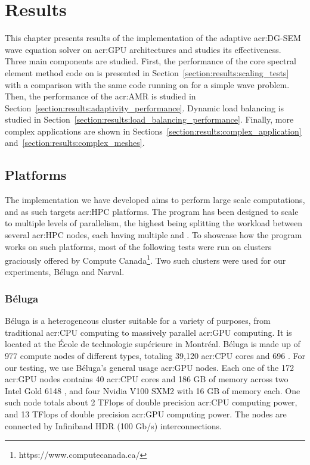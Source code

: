 \chapter{Results}\label{chapter:results}

This chapter presents results of the implementation of the adaptive \acrshort{acr:DG-SEM} wave
equation solver on \acrshort{acr:GPU} architectures and studies its effectiveness. Three main
components are studied. First, the performance of the core spectral element method code on
 is presented in Section~\ref{section:results:scaling_tests} with a comparison
with the same code running on  for a simple wave problem. Then, the performance
of the \acrlong{acr:AMR} is studied in Section~\ref{section:results:adaptivity_performance}. Dynamic
load balancing is studied in Section~\ref{section:results:load_balancing_performance}. Finally, more
complex applications are shown in Sections~\ref{section:results:complex_application}
and~\ref{section:results:complex_meshes}.

\section{Platforms}\label{section:results:platforms}

The implementation we have developed aims to perform large scale computations, and as such targets
\acrshort{acr:HPC} platforms. The program has been designed to scale to multiple levels of
parallelism, the highest being splitting the workload between several \acrshort{acr:HPC} nodes, each
having multiple  and . To showcase how the program works on
such platforms, most of the following tests were run on clusters graciously offered by Compute
Canada\footnote{https://www.computecanada.ca/}. Two such clusters were used for our experiments,
Béluga and Narval.

\subsection{Béluga}\label{subsection:results:platforms:beluga}

Béluga is a heterogeneous cluster suitable for a variety of purposes, from traditional
\acrshort{acr:CPU} computing to massively parallel \acrshort{acr:GPU} computing. It is located at
the École de technologie supérieure in Montréal. Béluga is made up of 977 compute nodes of different
types, totaling 39,120 \acrshort{acr:CPU} cores and 696 . For our testing, we
use Béluga's general usage \acrshort{acr:GPU} nodes. Each one of the 172 \acrshort{acr:GPU} nodes
contains 40 \acrshort{acr:CPU} cores and 186 GB of memory across two Intel Gold 6148
, and four Nvidia V100 SXM2  with 16 GB of memory each. One
such node totals about 2 TFlops of double precision \acrshort{acr:CPU} computing power, and 13
TFlops of double precision \acrshort{acr:GPU} computing power. The nodes are connected by Infiniband
HDR (100 Gb/s) interconnections.

